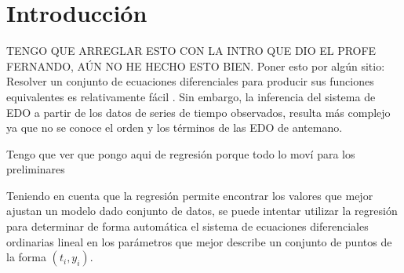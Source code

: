 \chapter*{Introducción}\label{chapter:introduction}

\qquad

TENGO QUE ARREGLAR ESTO CON LA INTRO QUE DIO EL PROFE FERNANDO, AÚN NO HE HECHO ESTO BIEN.
Poner esto por algún sitio:
Resolver un conjunto de ecuaciones diferenciales para producir sus funciones equivalentes es relativamente fácil \cite{iba2008inference}. Sin embargo, la inferencia del sistema de EDO a partir de los datos de series de tiempo observados, resulta más complejo ya que no se conoce el orden y los términos de las EDO de antemano.

Tengo que ver que pongo aqui de regresión porque todo lo moví para los preliminares




Teniendo en cuenta que la regresión permite encontrar los valores que mejor ajustan un modelo dado conjunto de datos, se puede intentar utilizar la regresión para determinar de forma automática el sistema de ecuaciones diferenciales ordinarias lineal en los parámetros que mejor describe un conjunto de puntos de la forma $(t_i, y_i)$.

